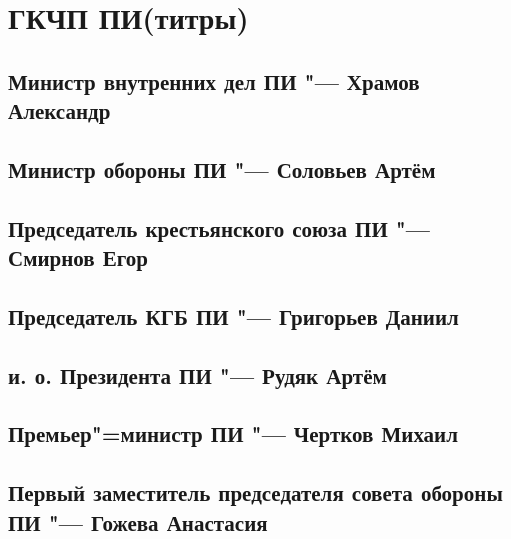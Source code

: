 \section{ГКЧП ПИ(титры)}

\subsection{Министр внутренних дел ПИ "--- Храмов Александр}

\subsection{Министр обороны ПИ "--- Соловьев Артём}

\subsection{Председатель крестьянского союза ПИ "--- Смирнов Егор}

\subsection{Председатель КГБ ПИ "--- Григорьев Даниил}

\subsection{и. о. Президента ПИ "--- Рудяк Артём}

\subsection{Премьер"=министр ПИ "--- Чертков Михаил}

\subsection{Первый заместитель председателя совета обороны ПИ "--- Гожева Анастасия}
